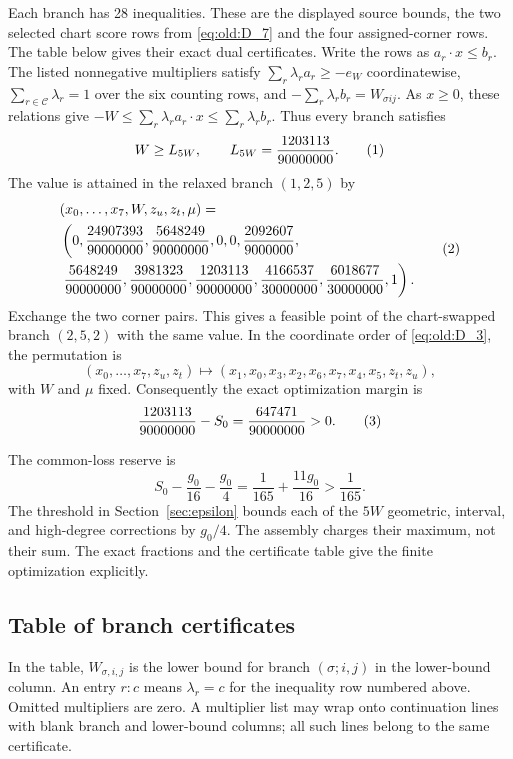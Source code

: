 Each branch has 28 inequalities. These are the displayed source bounds,
the two selected chart score rows from \eqref{eq:old:D_7} and the four
assigned-corner rows. The table below gives their exact
dual certificates. Write the rows as
$a_r\cdot x\le b_r$. The listed nonnegative multipliers satisfy
$\sum_r\lambda_r a_r\ge-e_W$ coordinatewise,
$\sum_{r\in\mathcal C}\lambda_r=1$ over the six counting rows, and
$-\sum_r\lambda_r b_r=W_{\sigma i j}$. As $x\ge0$, these relations
give $-W\le\sum_r\lambda_r a_r\cdot x\le\sum_r\lambda_r b_r$.
Thus every branch satisfies
\[
W\ge L_{5W},\qquad L_{5W}=\frac{1203113}{90000000}.
\AutoTag{eq:old:D_8}
\]
The value is attained in the relaxed branch $(1,2,5)$ by
\[
\begin{aligned}
&(x_0,\ldots,x_7,W,z_u,z_t,\mu)=\\
&\left(0,\frac{24907393}{90000000},\frac{5648249}{90000000},
0,0,\frac{2092607}{9000000},\right.\\
&\left.\frac{5648249}{90000000},\frac{3981323}{90000000},
\frac{1203113}{90000000},\frac{4166537}{30000000},
\frac{6018677}{30000000},1\right).
\end{aligned}
\AutoTag{eq:old:D_9}
\]
Exchange the two corner pairs. This gives a feasible point of the
chart-swapped branch $(2,5,2)$ with the same value. In
the coordinate order of \eqref{eq:old:D_3}, the permutation is
\[
(x_0,\ldots,x_7,z_u,z_t)\longmapsto
(x_1,x_0,x_3,x_2,x_6,x_7,x_4,x_5,z_t,z_u),
\]
with \(W\) and \(\mu\) fixed.
Consequently the exact optimization margin is
\[
\frac{1203113}{90000000}-S_0=\frac{647471}{90000000}>0.
\AutoTag{eq:old:D_10}
\]

The common-loss reserve is
\[
S_0-\frac{g_0}{16}-\frac{g_0}{4}
=\frac1{165}+\frac{11g_0}{16}>\frac1{165}.
\]
The threshold in Section~\ref{sec:epsilon} bounds each of the
$5W$ geometric, interval, and high-degree corrections by $g_0/4$.
The assembly charges their maximum, not their sum. The exact fractions and the certificate table give
the finite optimization explicitly.
\subsection*{Table of branch certificates}\label{app:branchcert}
In the table, $W_{\sigma,i,j}$ is the lower bound for branch
$(\sigma;i,j)$ in the lower-bound column. An entry $r:c$ means
$\lambda_r=c$ for the inequality row numbered above. Omitted
multipliers are zero.
A multiplier list may wrap onto continuation lines with blank branch
and lower-bound columns; all such lines belong to the same certificate.


